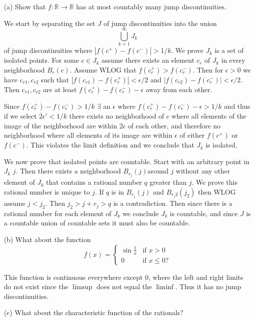 \documentclass{amsart}
\begin{document}
(a) Show that $f: \mathbb{R} \rightarrow \mathbb{R}$ has at most countably many jump 
discontinuities.

\medskip \noindent We start by separating the set $J$ of jump discontinuities into the union 
\[\bigcup_{k=1}^{\infty}J_k\] of jump discontinuities where $|f(c^+)-f(c^-)|>1/k$. We prove $J_k$
is a set of isolated points. For some $c\in J_k$ assume there exists an element $c_r$ of $J_k$ in every
neighborhood $B_r(c)$. Assume WLOG that $f(c_r^+)>f(c_r^-)$. Then for $\epsilon>0$ we have 
$c_{r1}, c_{r2}$ such that $|f(c_{r1})-f(c_r^+)|<\epsilon/2$ and $|f(c_{r2})-f(c_r^-)|<\epsilon/2$.
Then $c_{r1}, c_{r2}$ are at least $f(c_r^+)-f(c_r^-)-\epsilon$ away from each other. 

\medskip \noindent Since $f(c_r^+)-f(c_r^-)>1/k$
$\exists$ an $\epsilon$ where $f(c_r^+)-f(c_r^-)-\epsilon>1/k$ and thus if we select $2\epsilon'<1/k$ there exists no
neighborhood of $c$ where all elements of the image of the neighborhood are within $2\epsilon$ of each other, 
and therefore no neighborhood where all elements of its image are within $\epsilon$ of either $f(c^+)$ or $f(c^-)$.
This violates the limit definition and we conclude that $J_k$ is isolated. 

\medskip \noindent We now prove that isolated points are countable. Start with an arbitrary point in $J_k$ $j$. Then there
exists a neighborhood $B_{r_j}(j)$around $j$ without any other element of $J_k$ that contains a rational number $q$ greater than $j$. 
We prove this rational number is unique to $j$. If $q$ is in $B_{r_j}(j)$ and $B_{r_j2}(j_2)$ then WLOG assume $j<j_2$. Then 
$j_2>j+r_j>q$ is a contradiction. Then since there is a rational number for each element of $J_k$ we conclude $J_k$ is countable,
and since $J$ is a countable union of countable sets it must also be countable.

\bigskip

(b) What about the function \[f(x) = \begin{cases}
	\sin\frac{1}{x} & \text{if } x>0\\
	0 & \text{if } x\leq 0?
\end{cases}\]

\medskip \noindent This function is continuous everywhere except $0$, where the left and right limits do not
exist since the $\limsup$ does not equal the $\liminf$. Thus it has no jump discontinuities.

\bigskip

(c) What about the characteristic function of the rationals? 
\end{document}
